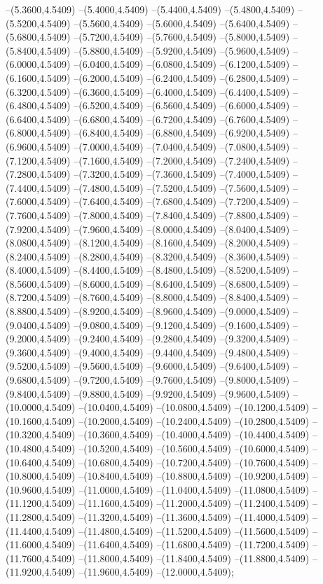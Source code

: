 {	--(5.3600,4.5409)
	--(5.4000,4.5409)
	--(5.4400,4.5409)
	--(5.4800,4.5409)
	--(5.5200,4.5409)
	--(5.5600,4.5409)
	--(5.6000,4.5409)
	--(5.6400,4.5409)
	--(5.6800,4.5409)
	--(5.7200,4.5409)
	--(5.7600,4.5409)
	--(5.8000,4.5409)
	--(5.8400,4.5409)
	--(5.8800,4.5409)
	--(5.9200,4.5409)
	--(5.9600,4.5409)
	--(6.0000,4.5409)
	--(6.0400,4.5409)
	--(6.0800,4.5409)
	--(6.1200,4.5409)
	--(6.1600,4.5409)
	--(6.2000,4.5409)
	--(6.2400,4.5409)
	--(6.2800,4.5409)
	--(6.3200,4.5409)
	--(6.3600,4.5409)
	--(6.4000,4.5409)
	--(6.4400,4.5409)
	--(6.4800,4.5409)
	--(6.5200,4.5409)
	--(6.5600,4.5409)
	--(6.6000,4.5409)
	--(6.6400,4.5409)
	--(6.6800,4.5409)
	--(6.7200,4.5409)
	--(6.7600,4.5409)
	--(6.8000,4.5409)
	--(6.8400,4.5409)
	--(6.8800,4.5409)
	--(6.9200,4.5409)
	--(6.9600,4.5409)
	--(7.0000,4.5409)
	--(7.0400,4.5409)
	--(7.0800,4.5409)
	--(7.1200,4.5409)
	--(7.1600,4.5409)
	--(7.2000,4.5409)
	--(7.2400,4.5409)
	--(7.2800,4.5409)
	--(7.3200,4.5409)
	--(7.3600,4.5409)
	--(7.4000,4.5409)
	--(7.4400,4.5409)
	--(7.4800,4.5409)
	--(7.5200,4.5409)
	--(7.5600,4.5409)
	--(7.6000,4.5409)
	--(7.6400,4.5409)
	--(7.6800,4.5409)
	--(7.7200,4.5409)
	--(7.7600,4.5409)
	--(7.8000,4.5409)
	--(7.8400,4.5409)
	--(7.8800,4.5409)
	--(7.9200,4.5409)
	--(7.9600,4.5409)
	--(8.0000,4.5409)
	--(8.0400,4.5409)
	--(8.0800,4.5409)
	--(8.1200,4.5409)
	--(8.1600,4.5409)
	--(8.2000,4.5409)
	--(8.2400,4.5409)
	--(8.2800,4.5409)
	--(8.3200,4.5409)
	--(8.3600,4.5409)
	--(8.4000,4.5409)
	--(8.4400,4.5409)
	--(8.4800,4.5409)
	--(8.5200,4.5409)
	--(8.5600,4.5409)
	--(8.6000,4.5409)
	--(8.6400,4.5409)
	--(8.6800,4.5409)
	--(8.7200,4.5409)
	--(8.7600,4.5409)
	--(8.8000,4.5409)
	--(8.8400,4.5409)
	--(8.8800,4.5409)
	--(8.9200,4.5409)
	--(8.9600,4.5409)
	--(9.0000,4.5409)
	--(9.0400,4.5409)
	--(9.0800,4.5409)
	--(9.1200,4.5409)
	--(9.1600,4.5409)
	--(9.2000,4.5409)
	--(9.2400,4.5409)
	--(9.2800,4.5409)
	--(9.3200,4.5409)
	--(9.3600,4.5409)
	--(9.4000,4.5409)
	--(9.4400,4.5409)
	--(9.4800,4.5409)
	--(9.5200,4.5409)
	--(9.5600,4.5409)
	--(9.6000,4.5409)
	--(9.6400,4.5409)
	--(9.6800,4.5409)
	--(9.7200,4.5409)
	--(9.7600,4.5409)
	--(9.8000,4.5409)
	--(9.8400,4.5409)
	--(9.8800,4.5409)
	--(9.9200,4.5409)
	--(9.9600,4.5409)
	--(10.0000,4.5409)
	--(10.0400,4.5409)
	--(10.0800,4.5409)
	--(10.1200,4.5409)
	--(10.1600,4.5409)
	--(10.2000,4.5409)
	--(10.2400,4.5409)
	--(10.2800,4.5409)
	--(10.3200,4.5409)
	--(10.3600,4.5409)
	--(10.4000,4.5409)
	--(10.4400,4.5409)
	--(10.4800,4.5409)
	--(10.5200,4.5409)
	--(10.5600,4.5409)
	--(10.6000,4.5409)
	--(10.6400,4.5409)
	--(10.6800,4.5409)
	--(10.7200,4.5409)
	--(10.7600,4.5409)
	--(10.8000,4.5409)
	--(10.8400,4.5409)
	--(10.8800,4.5409)
	--(10.9200,4.5409)
	--(10.9600,4.5409)
	--(11.0000,4.5409)
	--(11.0400,4.5409)
	--(11.0800,4.5409)
	--(11.1200,4.5409)
	--(11.1600,4.5409)
	--(11.2000,4.5409)
	--(11.2400,4.5409)
	--(11.2800,4.5409)
	--(11.3200,4.5409)
	--(11.3600,4.5409)
	--(11.4000,4.5409)
	--(11.4400,4.5409)
	--(11.4800,4.5409)
	--(11.5200,4.5409)
	--(11.5600,4.5409)
	--(11.6000,4.5409)
	--(11.6400,4.5409)
	--(11.6800,4.5409)
	--(11.7200,4.5409)
	--(11.7600,4.5409)
	--(11.8000,4.5409)
	--(11.8400,4.5409)
	--(11.8800,4.5409)
	--(11.9200,4.5409)
	--(11.9600,4.5409)
	--(12.0000,4.5409);
}
